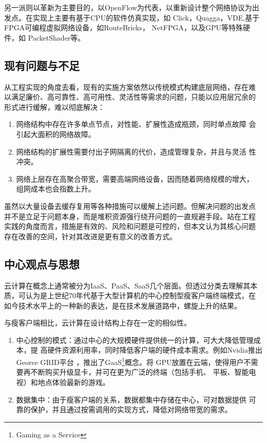 \documentclass[oneside, phd]{njuthesis}
\begin{document}
另一派则以革新为主要目的，以OpenFlow为代表，以重新设计整个网络协议为出
发点。在实现上主要有基于CPU的软件仿真实现，如
Click\cite{kohler2000click}，Quagga\cite{QUAGGA}，VDE\cite{VDE},基于
FPGA可编程虚拟网络设备，如RouteBricks\cite{dobrescu2009routebricks}，
NetFPGA\cite{lockwood2007netfpga}，以及GPU等特殊硬件，如
PacketShader\cite{han2010packetshader}等。

\subsection{现有问题与不足}

从工程实现的角度去看，现有的实施方案依然以传统模式构建底层网络，存在难
以满足廉价、高可靠性、高可用性、灵活性等需求的问题，只能以应用层冗余的
形式进行缓解，难以彻底解决：

\begin{enumerate}
\item 网络结构中存在许多单点节点，对性能、扩展性造成瓶颈，同时单点故障
  会引起大面积的网络故障。
\item 网络结构的扩展性需要付出子网隔离的代价，造成管理复杂，并且与灵活
  性冲突。
\item 网络上层存在高聚合带宽，需要高端网络设备，因而随着网络规模的增大，
  组网成本也会指数上升。
\end{enumerate}

虽然以大量设备去缓存复用等各种措施可以缓解上述问题。但解决问题的出发点
并不是立足于问题本身，而是堆积资源强行绕开问题的一直规避手段。站在工程
实践的角度而言，措施是有效的、风险和问题是可控的，但本文认为其核心问题
存在改善的空间，针对其改进是更有意义的改善方式。

\subsection{中心观点与思想}

云计算在概念上通常被分为IaaS、PaaS、SaaS几个层面。但透过分类去理解其本
质，可认为是上世纪70年代基于大型计算机的中心控制型瘦客户端终端模式，在
如今技术水平上的一种新的表达，是在技术发展道路中，螺旋上升的结果。

与瘦客户端相比，云计算在设计结构上存在一定的相似性。

\begin{enumerate}
\item 中心控制的模式：通过中心的大规模硬件提供统一的计算，可大大降低管理成本，提
  高硬件资源利用率，同时降低客户端的硬件成本需求。例如Nvidia推出Georce GRID平台
  \cite{NVIDIAGRID}，推出了GaaS\footnote{Gaming as a Service}概念。将
  GPU放置在云端，使得用户不需要再不断购买升级显卡，并可在更为广泛的终端（包括手机、
  平板、智能电视）和地点体验最新的游戏。
\item 数据集中：由于瘦客户端的关系，数据都集中存储在中心，可对数据提供
  可靠的保护，并且通过按需调用的实现方式，降低对网络带宽的需求。
\end{enumerate}
\end{document}
